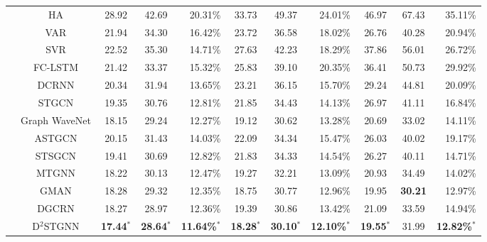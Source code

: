 \documentclass[sigconf, nonacm]{acmart}
\begin{document}
\begin{table*}[p]
\begin{tabular}{ccccr|ccr|ccr}
    \midrule  
    \hline
    \color{black}{\multirow{14}*{\textbf{PEMS04}}}
      &HA              & 28.92  & 42.69  & 20.31\%        & 33.73  & 49.37  & 24.01\%       & 46.97  & 67.43  & 35.11\% \\ 
      &VAR             & 21.94  & 34.30  & 16.42\%        & 23.72  & 36.58  & 18.02\%        & 26.76  & 40.28  & 20.94\% \\ 
      &SVR             & 22.52  & 35.30  & 14.71\%        & 27.63  & 42.23  & 18.29\%       & 37.86  & 56.01  & 26.72\% \\ 
      &FC-LSTM         & 21.42  & 33.37  & 15.32\%        & 25.83  & 39.10  & 20.35\%       & 36.41  & 50.73  & 29.92\% \\ 
      &DCRNN           & 20.34  & 31.94  & 13.65\%        & 23.21  & 36.15  & 15.70\%       & 29.24  & 44.81  & 20.09\% \\ 
      &STGCN           & 19.35  & 30.76  & 12.81\%        & 21.85  & 34.43  & 14.13\%       & 26.97  & 41.11  & 16.84\% \\ 
      &Graph WaveNet   & 18.15  & 29.24  & 12.27\%        & 19.12  & 30.62  & 13.28\%       & 20.69  & 33.02  & 14.11\% \\
      &ASTGCN          & 20.15  & 31.43  & 14.03\%        & 22.09  & 34.34  & 15.47\%       & 26.03  & 40.02  & 19.17\% \\  
      &STSGCN          & 19.41  & 30.69  & 12.82\%        & 21.83  & 34.33  & 14.54\%       & 26.27  & 40.11  & 14.71\% \\  
      &MTGNN           & 18.22  & 30.13  & 12.47\%        & 19.27  & 32.21  & 13.09\%       & 20.93  & 34.49  & 14.02\% \\  
      &GMAN            & 18.28  & 29.32  & 12.35\%        & 18.75  & 30.77  & 12.96\%       & 19.95  & \textbf{30.21}  & 12.97\% \\  
      &DGCRN           & 18.27  & 28.97  & 12.36\%        & 19.39  & 30.86  & 13.42\%       & 21.09  & 33.59  & 14.94\% \\  
    \cmidrule(r){2-11}
      &D$^2$STGNN      & \textbf{17.44}$^*$  & \textbf{28.64}$^*$  & \textbf{11.64\%}$^*$        & \textbf{18.28}$^*$  & \textbf{30.10}$^*$  & \textbf{12.10\%}$^*$      & \textbf{19.55}$^*$  & 31.99  & \textbf{12.82\%}$^*$ \\ 
    

\end{tabular}
\end{table*}
\end{document}
